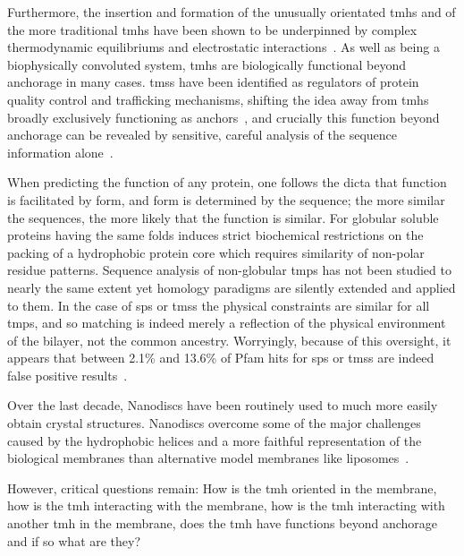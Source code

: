 Furthermore, the insertion and formation of the unusually orientated \gls{tmh}s and of the more traditional \gls{tmh}s have been shown to be underpinned by complex thermodynamic equilibriums and electrostatic interactions~\cite{Cymer2015, Elisa2012, Ismail2015}.
As well as being a biophysically convoluted system, \gls{tmh}s are biologically functional beyond anchorage in many cases.
\gls{tms}s have been identified as regulators of protein quality control and trafficking mechanisms, shifting the idea away from \gls{tmh}s broadly exclusively functioning as anchors~\cite{Hessa2011}, and crucially this function beyond anchorage can be revealed by sensitive, careful analysis of the sequence information alone~\cite{Wong2012}.

When predicting the function of any protein, one follows the dicta that function is facilitated by form, and form is determined by the sequence; the more similar the sequences, the more likely that the function is similar.
For globular soluble proteins having the same folds induces strict biochemical restrictions on the packing of a hydrophobic protein core which requires similarity of non-polar residue patterns.
Sequence analysis of non-globular \gls{tmp}s has not been studied to nearly the same extent yet homology paradigms are silently extended and applied to them.
In the case of \gls{sp}s or \gls{tms}s the physical constraints are similar for all \gls{tmp}s, and so matching is indeed merely a reflection of the physical environment of the bilayer, not the common ancestry.
Worryingly, because of this oversight, it appears that between 2.1\% and 13.6\% of Pfam hits for \gls{sp}s or \gls{tms}s are indeed false positive results~\cite{Wong2010}.



 Over the last decade, Nanodiscs have been routinely used to much more easily obtain crystal structures.
Nanodiscs overcome some of the major challenges caused by the hydrophobic helices and a more faithful representation of the biological membranes than alternative model membranes like liposomes~\cite{Borch2009}.

 However, critical questions remain: How is the \gls{tmh} oriented in the membrane, how is the \gls{tmh} interacting with the membrane, how is the \gls{tmh} interacting with another \gls{tmh} in the membrane, does the \gls{tmh} have functions beyond anchorage and if so what are they?


